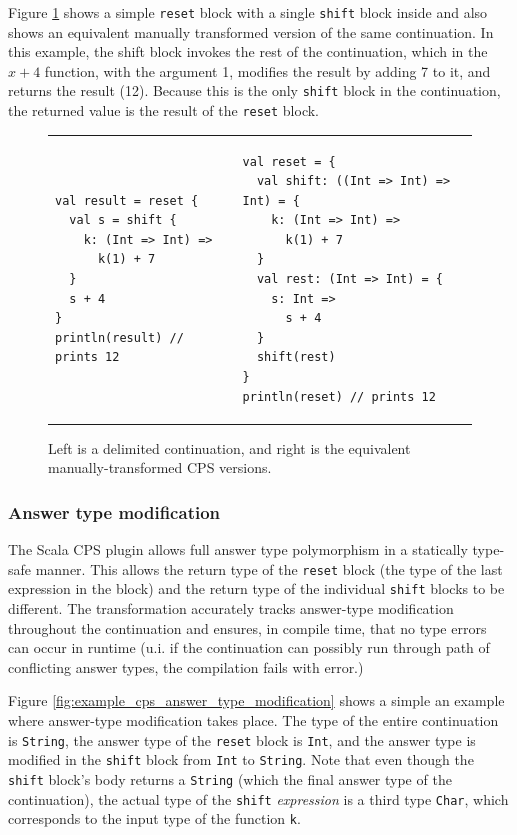 Figure \ref{fig:example_cps_generic} shows a simple \texttt{reset} block with a single \texttt{shift} block inside and also shows an equivalent manually transformed version of the same continuation. In this example, the shift block invokes the rest of the continuation, which in the \(x+4\) function, with the argument 1, modifies the result by adding 7 to it, and returns the result (12). Because this is the only \texttt{shift} block in the continuation, the returned value is the result of the \texttt{reset} block.

\begin{figure}[h!]
 
\begin{tabular}{ C{7cm}  C{8cm}}

\begin{lstlisting}
val result = reset {
  val s = shift {
    k: (Int => Int) =>
      k(1) + 7
  }
  s + 4
}
println(result) // prints 12
\end{lstlisting}
&
\begin{lstlisting}
val reset = {
  val shift: ((Int => Int) => Int) = {
    k: (Int => Int) =>
      k(1) + 7
  }
  val rest: (Int => Int) = {
    s: Int =>
      s + 4
  }
  shift(rest)
}
println(reset) // prints 12
\end{lstlisting}
\\
\end{tabular}
\caption{Left is a delimited continuation, and right is the equivalent manually-transformed CPS versions.}
\label{fig:example_cps_generic}
\end{figure}

\subsubsection{Answer type modification}

The Scala CPS plugin allows full answer type polymorphism in a statically type-safe manner. This allows the return type of the \texttt{reset} block (the type of the last expression in the block) and the return type of the individual \texttt{shift} blocks to be different. The transformation accurately tracks answer-type modification throughout the continuation and ensures, in compile time, that no type errors can occur in runtime (u.i. if the continuation can possibly run through path of conflicting answer types, the compilation fails with error.)

Figure \ref{fig:example_cps_answer_type_modification} shows a simple an example where answer-type modification takes place. The type of the entire continuation is \texttt{String}, the answer type of the \texttt{reset} block is \texttt{Int}, and the answer type is modified in the \texttt{shift} block from \texttt{Int} to \texttt{String}. Note that even though the \texttt{shift} block's body returns a \texttt{String} (which the final answer type of the continuation), the actual type of the \texttt{shift} \emph{expression} is a third type \texttt{Char}, which corresponds to the input type of the function \texttt{k}.

